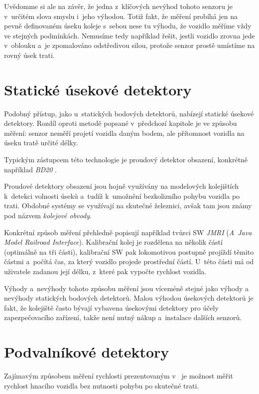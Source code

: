 Uvědomme si ale na závěr, že jedna z~klíčových nevýhod tohoto senzoru je
v~určitém slova smyslu i~jeho výhodou. Totiž fakt, že měření probíhá jen na pevně
definovaném úseku koleje s~sebou nese tu výhodu, že vozidlo měříme vždy ve
stejných podmínkách. Nemusíme tedy například řešit, jestli vozidlo zrovna jede
v~oblouku a~je zpomalováno odstředivou silou, protože senzor prostě umístíme
na rovný úsek trati.

\section{Statické úsekové detektory}
\label{sec:det-usek}

Podobný přístup, jako u~statických bodových detektorů, nabízejí statické
úsekové detektory. Rozdíl oproti metodě popsané v~předchozí kapitole je
ve způsobu měření: senzor neměří projetí vozidla daným bodem, ale přítomnost
vozidla na úseku tratě určité délky.

Typickým zástupcem této technologie je proudový detektor obsazení, konkrétně
například \textit{BD20} \cite{bd20}.

Proudové detektory obsazení jsou hojně využívány na modelových kolejištích k~detekci
volnosti úseků a~tudíž k~umožnění bezkolizního pohybu vozidla po trati.
Obdobné systémy se využívají na skutečné železnici, avšak tam jsou známy pod
názvem \textit{kolejové obvody}.

Konkrétní způsob měření přehledně popisují například tvůrci SW \textit{JMRI}
\cite{jmri:speedometer} (\textit{A~Java Model Railroad Interface}).
Kalibrační kolej je rozdělena na několik částí (optimálně na tři části),
kalibrační SW pak lokomotivou postupně projíždí těmito částmi a~počítá čas, za
který vozidlo projede prostřední částí. U~této části má od uživatele zadanou
její délku, z~které pak vypočte rychlost vozidla.

Výhody a~nevýhody tohoto způsobu měření jsou víceméně stejné jako výhody a
nevýhody statických bodových detektorů. Malou výhodou úsekových detektorů je
fakt, že kolejiště často bývají vybavena úsekovými detektory pro účely
zapezpečovacího zařízení, takže není nutný nákup a~instalace dalších senzorů.

\section{Podvalníkové detektory}
\label{sec:det-podval}

Zajímavým způsobem měření rychlosti prezentovaným v~\cite{bachrus}
je možnost měřit rychlost hnacího vozidla bez nutnosti pohybu po skutečné trati.

